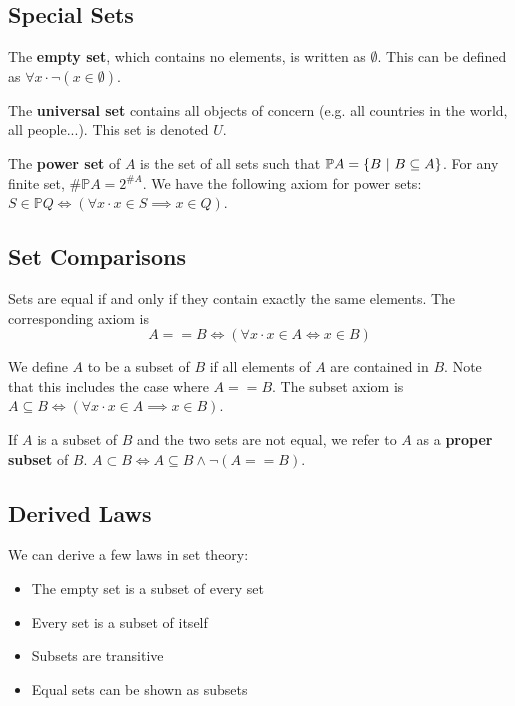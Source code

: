 \documentclass[12pt]{article}
\begin{document}
\subsection*{Special Sets}
The {\bf empty set}, which contains no elements, is written as $\emptyset$. This can be defined as $\forall x \cdot \neg(x \in \emptyset)$.

The {\bf universal set} contains all objects of concern (e.g. all countries in the world, all people...). This set is denoted $U$.

The {\bf power set} of $A$ is the set of all sets such that $\mathbb{P}A = \{ B \ |\  B \subseteq A \}$. For any finite set, $\#\mathbb{P}A = 2^{\#A}$. We have the following axiom for power sets: $S \in \mathbb{P} Q \iff (\forall x \cdot x \in S \implies x \in Q)$.

\subsection*{Set Comparisons}
Sets are equal if and only if they contain exactly the same elements. The corresponding axiom is \[ A == B \iff (\forall x \cdot x \in A \iff x \in B) \]

We define $A$ to be a subset of $B$ if all elements of $A$ are contained in $B$. Note that this includes the case where $A == B$. The subset axiom is $A \subseteq B \iff (\forall x \cdot x \in A \implies x \in B)$.

If $A$ is a subset of $B$ and the two sets are not equal, we refer to $A$ as a {\bf proper subset} of $B$. $A \subset B \iff A \subseteq B \land \neg(A == B)$.

\subsection*{Derived Laws}
We can derive a few laws in set theory:
\begin{itemize}
\item The empty set is a subset of every set
\item Every set is a subset of itself
\item Subsets are transitive
\item Equal sets can be shown as subsets
\end{itemize}
\end{document}
